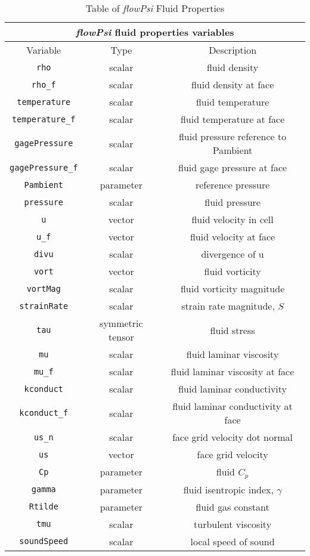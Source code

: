 \documentclass[letterpaper,twoside]{article}
\begin{document}
\begin{table}
\caption{Table of {\it flowPsi} Fluid Properties}
\label{tab:flowPsiFluid}
\begin{center}
\begin{tabular}{|c|c|c|}
\hline
\multicolumn{3}{|c|}{ {\it flowPsi} fluid properties variables}\\
\hline
Variable & Type & Description\\
\hline\hline
{\tt rho} & scalar & fluid density\\
{\tt rho\_f} & scalar & fluid density at face\\
{\tt temperature} & scalar & fluid temperature\\
{\tt temperature\_f} & scalar & fluid temperature at face\\
{\tt gagePressure} & scalar & fluid pressure reference to Pambient\\
{\tt gagePressure\_f} & scalar & fluid gage pressure at face\\
{\tt Pambient} & parameter & reference pressure\\
{\tt pressure} & scalar & fluid pressure\\
{\tt u} & vector & fluid velocity in cell\\
{\tt u\_f} & vector & fluid velocity at face\\
{\tt divu} & scalar & divergence of u\\
{\tt vort} & vector & fluid vorticity\\
{\tt vortMag} & scalar & fluid vorticity magnitude\\
{\tt strainRate} & scalar & strain rate magnitude, $S$\\
{\tt tau} & symmetric tensor & fluid stress\\
{\tt mu} & scalar & fluid laminar viscosity\\
{\tt mu\_f} & scalar & fluid laminar viscosity at face\\
{\tt kconduct} & scalar & fluid laminar conductivity\\
{\tt kconduct\_f} & scalar & fluid laminar conductivity at face\\
{\tt us\_n} & scalar & face grid velocity dot normal\\
{\tt us} & vector & face grid velocity\\
{\tt Cp} & parameter & fluid $C_p$\\
{\tt gamma} & parameter & fluid isentropic index, $\gamma$\\
{\tt Rtilde} & parameter & fluid gas constant\\
{\tt tmu} & scalar & turbulent viscosity\\
{\tt soundSpeed} & scalar & local speed of sound\\
\hline
\end{tabular}
\end{center}
\end{table}
\end{document}
